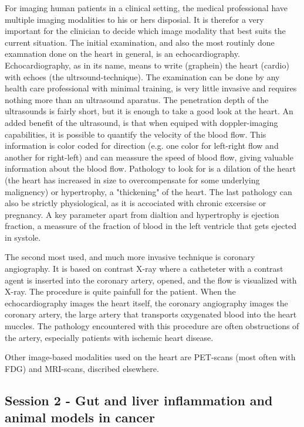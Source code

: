 \documentclass[12p]{article}
\begin{document}
For imaging human patients in a clinical setting, the medical professional have multiple imaging modalities to his or hers disposial.
It is therefor a very important for the clinician to decide which image modality that best suits the current situation.
The initial examination, and also the most routinly done examnation done on the heart in general, is an echocardiography.
Echocardiography, as in its name, means to write (graphein) the heart (cardio) with echoes (the ultrsound-technique).
The examination can be done by any health care professional with minimal training, is very little invasive and requires nothing more than an ultrasound aparatus.
The penetration depth of the ultrasounds is fairly short, but it is enough to take a good look at the heart.
An added benefit of the ultrasound, is that when equiped with doppler-imaging capabilities, it is possible to quantify the velocity of the blood flow.
This information is color coded for direction (e.g. one color for left-right flow and another for right-left) and can meassure the speed of blood flow, giving valuable information about the blood flow.
Pathology to look for is a dilation of the heart (the heart has increased in size to overcompensate for some underlying malignency) or hypertrophy, a "thickening" of the heart.
The last pathology can also be strictly physiological, as it is accociated with chronic excersise or pregnancy.
A key parameter apart from dialtion and hypertrophy is ejection fraction, a meassure of the fraction of blood in the left ventricle that gets ejected in systole.

The second most used, and much more invasive technique is coronary angiography.
It is based on contrast X-ray where a catheteter with a contrast agent is inserted into the coronary artery, opened, and the flow is visualized with X-ray.
The procedure is quite painfull for the patient.
When the echocardiography images the heart itself, the coronary angiography images the coronary artery, the large artery that transports oxygenated blood into the heart muccles.
The pathology encountered with this procedure are often obstructions of the artery, especially patients with ischemic heart disease. 

Other image-based modalities used on the heart are PET-scans (most often with FDG) and MRI-scans, discribed elsewhere.

\subsection*{Session 2 - Gut and liver inflammation and animal models in cancer}
\end{document}
